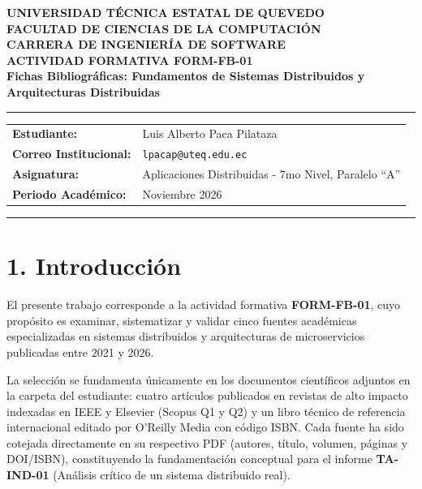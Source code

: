 \documentclass[11pt,a4paper]{article}
\begin{document}
\begin{center}
    {\large \textbf{UNIVERSIDAD TÉCNICA ESTATAL DE QUEVEDO}}\\[1.5mm]
    {\normalsize \textbf{FACULTAD DE CIENCIAS DE LA COMPUTACIÓN}}\\[1.5mm]
    {\normalsize \textbf{CARRERA DE INGENIERÍA DE SOFTWARE}}\\[4mm]
    
    {\Large \textbf{ACTIVIDAD FORMATIVA FORM-FB-01}}\\[2mm]
    {\large \textbf{Fichas Bibliográficas: Fundamentos de Sistemas Distribuidos y Arquitecturas Distribuidas}}\\[1mm]
\end{center}

\vspace{2mm}
\hrule
\vspace{3mm}

\noindent
\begin{tabular}{@{}ll@{}}
    \textbf{Estudiante:} & Luis Alberto Paca Pilataza \\
    \textbf{Correo Institucional:} & \texttt{lpacap@uteq.edu.ec} \\
    \textbf{Asignatura:} & Aplicaciones Distribuidas - 7mo Nivel, Paralelo ``A'' \\
    \textbf{Periodo Académico:} & Noviembre 2026 \\
\end{tabular}

\vspace{3mm}
\hrule
\vspace{5mm}

\section*{1. Introducción}
El presente trabajo corresponde a la actividad formativa \textbf{FORM-FB-01}, cuyo propósito es examinar, sistematizar y validar cinco fuentes académicas especializadas en sistemas distribuidos y arquitecturas de microservicios publicadas entre 2021 y 2026. 

La selección se fundamenta únicamente en los documentos científicos adjuntos en la carpeta del estudiante: cuatro artículos publicados en revistas de alto impacto indexadas en IEEE y Elsevier (Scopus Q1 y Q2) y un libro técnico de referencia internacional editado por O'Reilly Media con código ISBN. Cada fuente ha sido cotejada directamente en su respectivo PDF (autores, título, volumen, páginas y DOI/ISBN), constituyendo la fundamentación conceptual para el informe \textbf{TA-IND-01} (Análisis crítico de un sistema distribuido real).
\end{document}
